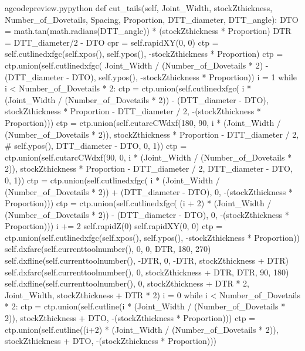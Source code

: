 \documentclass{ltxdoc}
\begin{document}
\lstset{firstnumber=\thegcpy}
\begin{writecode}{a}{gcodepreview.py}{python}
    def cut_tails(self, Joint_Width, stockZthickness, Number_of_Dovetails, Spacing, Proportion, DTT_diameter, DTT_angle):
        DTO = math.tan(math.radians(DTT_angle)) * (stockZthickness * Proportion)
        DTR = DTT_diameter/2 - DTO
        cpr = self.rapidXY(0, 0)
        ctp = self.cutlinedxfgc(self.xpos(), self.ypos(), -stockZthickness * Proportion)
        ctp = ctp.union(self.cutlinedxfgc(
            Joint_Width / (Number_of_Dovetails * 2) - (DTT_diameter - DTO), 
            self.ypos(), 
            -stockZthickness * Proportion))
        i = 1
        while i < Number_of_Dovetails * 2:
            ctp = ctp.union(self.cutlinedxfgc(
                i * (Joint_Width / (Number_of_Dovetails * 2)) - (DTT_diameter - DTO), 
                stockZthickness * Proportion - DTT_diameter / 2,
                -(stockZthickness * Proportion)))
            ctp = ctp.union(self.cutarcCWdxf(180, 90, 
                i * (Joint_Width / (Number_of_Dovetails * 2)), 
                stockZthickness * Proportion - DTT_diameter / 2,
#                self.ypos(), 
                DTT_diameter - DTO,  0, 1))
            ctp = ctp.union(self.cutarcCWdxf(90, 0, 
                i * (Joint_Width / (Number_of_Dovetails * 2)), 
                stockZthickness * Proportion - DTT_diameter / 2, 
                DTT_diameter - DTO,  0, 1))
            ctp = ctp.union(self.cutlinedxfgc(
                i * (Joint_Width / (Number_of_Dovetails * 2)) + (DTT_diameter - DTO), 
                0, 
                -(stockZthickness * Proportion)))
            ctp = ctp.union(self.cutlinedxfgc(
                (i + 2) * (Joint_Width / (Number_of_Dovetails * 2)) - (DTT_diameter - DTO), 
                0, 
                -(stockZthickness * Proportion)))
            i += 2
        self.rapidZ(0)
        self.rapidXY(0, 0)
        ctp = ctp.union(self.cutlinedxfgc(self.xpos(), self.ypos(), -stockZthickness * Proportion))
        self.dxfarc(self.currenttoolnumber(), 0, 0, DTR, 180, 270)
        self.dxfline(self.currenttoolnumber(), -DTR, 0, -DTR, stockZthickness + DTR)
        self.dxfarc(self.currenttoolnumber(), 0, stockZthickness + DTR, DTR, 90, 180)
        self.dxfline(self.currenttoolnumber(), 0, stockZthickness + DTR * 2, Joint_Width, stockZthickness + DTR * 2)
        i = 0
        while i < Number_of_Dovetails * 2:
            ctp = ctp.union(self.cutline(i * (Joint_Width / (Number_of_Dovetails * 2)), stockZthickness + DTO, -(stockZthickness * Proportion)))
            ctp = ctp.union(self.cutline((i+2) * (Joint_Width / (Number_of_Dovetails * 2)), stockZthickness + DTO, -(stockZthickness * Proportion)))

\end{writecode}
\end{document}
